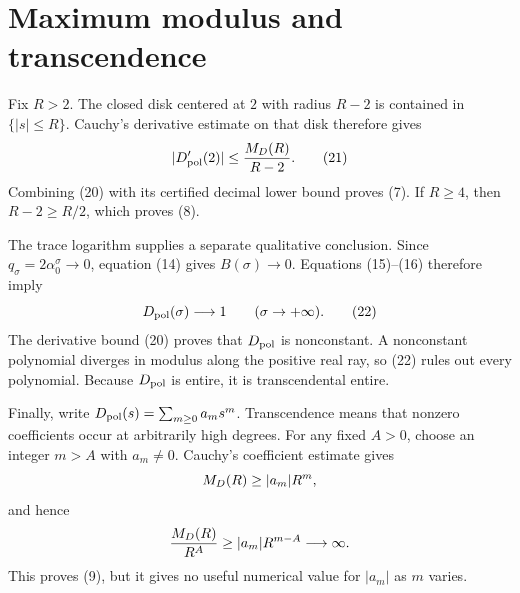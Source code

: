 \section{Maximum modulus and transcendence}

Fix \(R>2\).  The closed disk centered at \(2\) with radius \(R-2\) is
contained in \(\{|s|\le R\}\).  Cauchy's derivative estimate on that disk
therefore gives
\[
 |D_{\mathrm{pol}}'(2)|\le\frac{M_D(R)}{R-2}.
 \tag{21}
\]
Combining (20) with its certified decimal lower bound proves (7).  If
\(R\ge4\), then \(R-2\ge R/2\), which proves (8).

The trace logarithm supplies a separate qualitative conclusion.  Since
\(q_\sigma=2\alpha_0^\sigma\to0\), equation (14) gives
\(B(\sigma)\to0\).  Equations (15)--(16) therefore imply
\[
 D_{\mathrm{pol}}(\sigma)\longrightarrow1
 \qquad(\sigma\to+\infty).
 \tag{22}
\]
The derivative bound (20) proves that \(D_{\mathrm{pol}}\) is nonconstant.  A
nonconstant polynomial diverges in modulus along the positive real ray, so
(22) rules out every polynomial.  Because \(D_{\mathrm{pol}}\) is entire, it is
transcendental entire.

Finally, write \(D_{\mathrm{pol}}(s)=\sum_{m\ge0}a_ms^m\).  Transcendence means that
nonzero coefficients occur at arbitrarily high degrees.  For any fixed
\(A>0\), choose an integer \(m>A\) with \(a_m\ne0\).  Cauchy's coefficient
estimate gives
\[
 M_D(R)\ge |a_m|R^m,
\]
and hence
\[
 \frac{M_D(R)}{R^A}
 \ge |a_m|R^{m-A}\longrightarrow\infty.
\]
This proves (9), but it gives no useful numerical value for \(|a_m|\) as
\(m\) varies.
